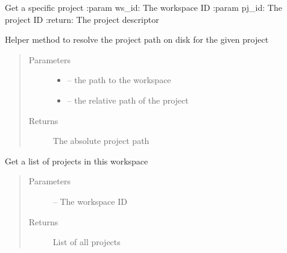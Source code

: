 \documentclass[letterpaper,10pt,english]{sphinxmanual}
\begin{document}

\begin{fulllineitems}
\label{_source/son_editor.impl:son_editor.impl.projectsimpl.get_project}
Get a specific project 
:param ws\_id: The workspace ID
:param pj\_id: The project ID
:return: The project descriptor

\end{fulllineitems}


\begin{fulllineitems}
\label{_source/son_editor.impl:son_editor.impl.projectsimpl.get_project_path}
Helper method to resolve the project path on disk for the given project
\begin{quote}\begin{description}
\item[{Parameters}] \leavevmode\begin{itemize}
\item {} 
 -- the path to the workspace

\item {} 
 -- the relative path of the project

\end{itemize}

\item[{Returns}] \leavevmode
The absolute project path

\end{description}\end{quote}

\end{fulllineitems}


\begin{fulllineitems}
\label{_source/son_editor.impl:son_editor.impl.projectsimpl.get_projects}
Get a list of projects in this workspace
\begin{quote}\begin{description}
\item[{Parameters}] \leavevmode
{} -- The workspace ID

\item[{Returns}] \leavevmode
List of all projects

\end{description}\end{quote}

\end{fulllineitems}
\end{document}
